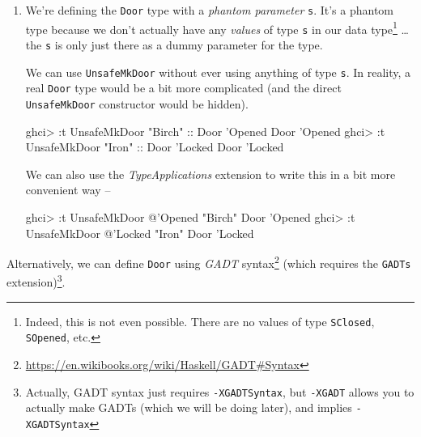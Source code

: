 \documentclass[]{article}
\newenvironment{Shaded}{}{}
\newcommand{\DataTypeTok}[1]{\textcolor[rgb]{0.56,0.13,0.00}{#1}}
\newcommand{\FunctionTok}[1]{\textcolor[rgb]{0.02,0.16,0.49}{#1}}
\newcommand{\NormalTok}[1]{#1}
\newcommand{\OtherTok}[1]{\textcolor[rgb]{0.00,0.44,0.13}{#1}}
\newcommand{\StringTok}[1]{\textcolor[rgb]{0.25,0.44,0.63}{#1}}
\renewcommand{\href}[2]{#2\footnote{\url{#1}}}
\begin{document}
\begin{enumerate}
\def\labelenumi{\arabic{enumi}.}
\setcounter{enumi}{2}
\item
  We're defining the \texttt{Door} type with a \emph{phantom parameter}
  \texttt{s}. It's a phantom type because we don't actually have any
  \emph{values} of type \texttt{s} in our data type\footnote{Indeed, this is not
    even possible. There are no values of type
    \texttt{\textquotesingle{}SClosed}, \texttt{\textquotesingle{}SOpened}, etc.}
  \ldots{}the \texttt{s} is only just there as a dummy parameter for the type.

  We can use \texttt{UnsafeMkDoor} without ever using anything of type
  \texttt{s}. In reality, a real \texttt{Door} type would be a bit more
  complicated (and the direct \texttt{UnsafeMkDoor} constructor would be
  hidden).

\begin{Shaded}
\begin{Highlighting}[]
\NormalTok{ghci}\FunctionTok{>} \FunctionTok{:}\NormalTok{t }\DataTypeTok{UnsafeMkDoor} \StringTok{"Birch"}\OtherTok{ ::} \DataTypeTok{Door}\NormalTok{ '}\DataTypeTok{Opened}
\DataTypeTok{Door}\NormalTok{ '}\DataTypeTok{Opened}
\NormalTok{ghci}\FunctionTok{>} \FunctionTok{:}\NormalTok{t }\DataTypeTok{UnsafeMkDoor} \StringTok{"Iron"}\OtherTok{ ::} \DataTypeTok{Door}\NormalTok{ '}\DataTypeTok{Locked}
\DataTypeTok{Door}\NormalTok{ '}\DataTypeTok{Locked}
\end{Highlighting}
\end{Shaded}

  We can also use the \emph{TypeApplications} extension to write this in a bit
  more convenient way --

\begin{Shaded}
\begin{Highlighting}[]
\NormalTok{ghci}\FunctionTok{>} \FunctionTok{:}\NormalTok{t }\DataTypeTok{UnsafeMkDoor} \FunctionTok{@}\NormalTok{'}\DataTypeTok{Opened} \StringTok{"Birch"}
\DataTypeTok{Door}\NormalTok{ '}\DataTypeTok{Opened}
\NormalTok{ghci}\FunctionTok{>} \FunctionTok{:}\NormalTok{t }\DataTypeTok{UnsafeMkDoor} \FunctionTok{@}\NormalTok{'}\DataTypeTok{Locked} \StringTok{"Iron"}
\DataTypeTok{Door}\NormalTok{ '}\DataTypeTok{Locked}
\end{Highlighting}
\end{Shaded}
\end{enumerate}

Alternatively, we can define \texttt{Door} using
\href{https://en.wikibooks.org/wiki/Haskell/GADT\#Syntax}{\emph{GADT} syntax}
(which requires the \texttt{GADTs} extension)\footnote{Actually, GADT syntax
  just requires \texttt{-XGADTSyntax}, but \texttt{-XGADT} allows you to
  actually make GADTs (which we will be doing later), and implies
  \texttt{-XGADTSyntax}}.
\end{document}

